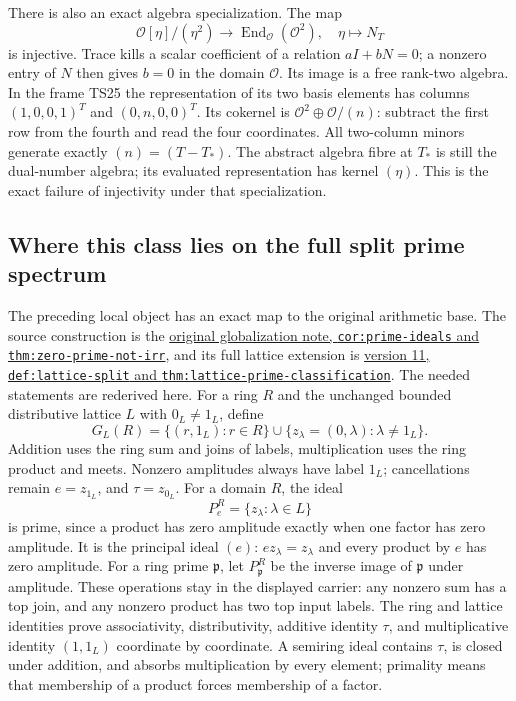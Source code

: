 There is also an exact algebra specialization. The map
\[
 \mathcal O[\eta]/(\eta^2)\longrightarrow
       \operatorname{End}_{\mathcal O}(\mathcal O^2),
 \quad \eta\longmapsto N_T\tag{TS29}
\]
is injective. Trace kills a scalar coefficient of a relation
\(aI+bN=0\); a nonzero entry of \(N\) then gives \(b=0\)
in the domain \(\mathcal O\). Its image is a free rank-two
algebra. In the frame TS25 the representation of its two basis
elements has columns \((1,0,0,1)^T\) and \((0,n,0,0)^T\).
Its cokernel is \(\mathcal O^2\oplus\mathcal O/(n)\):
subtract the first row from the fourth and read the four coordinates.
All two-column minors generate exactly \((n)=(T-T_*)\).
The abstract algebra fibre at \(T_*\) is still the dual-number
algebra; its evaluated representation has kernel \((\eta)\).
This is the exact failure of injectivity under that specialization.

\subsection{Where this class lies on the full split prime spectrum}
The preceding local object has an exact map to the original arithmetic
base. The source construction is the
\href{https://github.com/KokunoYumeto/zeta-function-research-reader/blob/d2f0020a7c446f429682925c1c682d99ba86a4cc/workbenches/splitzero-tandem/foundations/globalization-semiring/globalization_note.tex}{original globalization note,
\texttt{cor:prime-ideals} and \texttt{thm:zero-prime-not-irr}},
and its full lattice extension is
\href{https://github.com/KokunoYumeto/zeta-function-research-reader/blob/a2851f9eb352e7e4376bc629de86fa4ed9c1c434/workbenches/splitzero-tandem/foundations/split-support-geometry-v11/split_support_geometry_arithmetic_curve_v11.tex}{version 11,
\texttt{def:lattice-split} and \texttt{thm:lattice-prime-classification}}.
The needed statements are rederived here. For a ring \(R\) and the unchanged bounded distributive
lattice \(L\) with \(0_L\ne1_L\), define
\[
 G_L(R)=\{(r,1_L):r\in R\}\cup\{z_\lambda=(0,\lambda):\lambda\ne1_L\}.
 \tag{TS30}
\]
Addition uses the ring sum and joins of labels, multiplication uses
the ring product and meets. Nonzero amplitudes always have label
\(1_L\); cancellations remain \(e=z_{1_L}\), and
\(\tau=z_{0_L}\). For a domain \(R\), the ideal
\[
P_e^R=\{z_\lambda:\lambda\in L\}
\]
is prime, since a product has zero amplitude exactly when one factor
has zero amplitude. It is the principal ideal \((e)\):
\(e z_\lambda=z_\lambda\) and every product by \(e\) has zero amplitude.
For a ring prime \(\mathfrak p\), let \(P_{\mathfrak p}^R\)
be the inverse image of \(\mathfrak p\) under amplitude.
These operations stay in the displayed carrier: any nonzero sum
has a top join, and any nonzero product has two top input labels.
The ring and lattice identities prove associativity, distributivity,
additive identity \(\tau\), and multiplicative identity \((1,1_L)\)
coordinate by coordinate. A semiring ideal contains \(\tau\), is
closed under addition, and absorbs multiplication by every element;
primality means that membership of a product forces membership of a factor.


